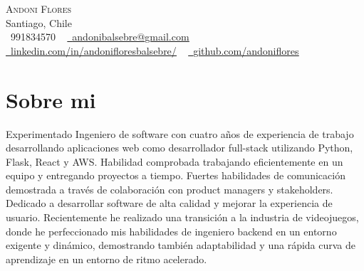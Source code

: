 \documentclass[letterpaper,11pt]{article}
\newcommand{\resumeSubHeadingListStart}{\begin{itemize}[leftmargin=0.0in, label={}]}
\newcommand{\resumeSubHeadingListEnd}{\end{itemize}}
\begin{document}

\begin{center}
    {\Huge \scshape Andoni Flores} \\ \vspace{1pt}
    Santiago, Chile  \\ \vspace{1pt}
    \small \raisebox{-0.1\height}\faPhone\ 991834570 ~ \href{mailto:andonibalsebre@gmail.com}{\raisebox{-0.2\height}\faEnvelope\  \underline{andonibalsebre@gmail.com}} ~ 
    \href{https://linkedin.com/in/andonifloresbalsebre/}{\raisebox{-0.2\height}\faLinkedin\ \underline{linkedin.com/in/andonifloresbalsebre/}}  ~
    \href{https://github.com/andoniflores}{\raisebox{-0.2\height}\faGithub\ \underline{github.com/andoniflores}}
    \vspace{-8pt}
\end{center}
%

\section{Sobre mi}
  \resumeSubHeadingListStart
    \small{\item{Experimentado Ingeniero de software con cuatro años de experiencia de trabajo
        desarrollando aplicaciones web como desarrollador full-stack utilizando Python, Flask,
        React y AWS. Habilidad comprobada trabajando eficientemente en un equipo y entregando
        proyectos a tiempo. Fuertes habilidades de comunicación demostrada a través de colaboración
        con product managers y stakeholders. Dedicado a desarrollar software de alta calidad y
        mejorar la experiencia de usuario. Recientemente he realizado una transición a la industria 
        de videojuegos, donde he perfeccionado mis habilidades de ingeniero backend en un entorno exigente
        y dinámico, demostrando también adaptabilidad y una rápida curva de aprendizaje en un entorno de ritmo
        acelerado.}}
  \resumeSubHeadingListEnd

\end{document}

